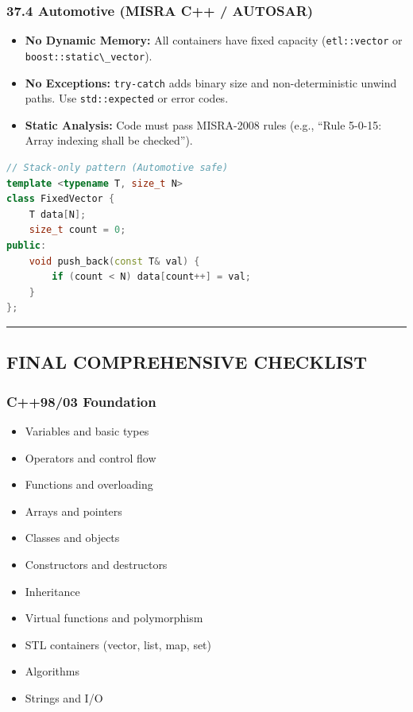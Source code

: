 \hypertarget{automotive-misra-c-autosar}{%
\subsubsection{37.4 Automotive (MISRA C++ /
AUTOSAR)}\label{automotive-misra-c-autosar}}

\begin{itemize}
\tightlist
\item
  \textbf{No Dynamic Memory:} All containers have fixed capacity
  (\passthrough{\lstinline!etl::vector!} or
  \passthrough{\lstinline!boost::static\_vector!}).
\item
  \textbf{No Exceptions:} \passthrough{\lstinline!try-catch!} adds
  binary size and non-deterministic unwind paths. Use
  \passthrough{\lstinline!std::expected!} or error codes.
\item
  \textbf{Static Analysis:} Code must pass MISRA-2008 rules (e.g.,
  ``Rule 5-0-15: Array indexing shall be checked'').
\end{itemize}

\begin{lstlisting}[language={C++}]
// Stack-only pattern (Automotive safe)
template <typename T, size_t N>
class FixedVector {
    T data[N];
    size_t count = 0;
public:
    void push_back(const T& val) {
        if (count < N) data[count++] = val;
    }
};
\end{lstlisting}

\begin{center}\rule{0.5\linewidth}{0.5pt}\end{center}

\hypertarget{final-comprehensive-checklist}{%
\subsection{FINAL COMPREHENSIVE
CHECKLIST}\label{final-comprehensive-checklist}}

\hypertarget{c9803-foundation}{%
\subsubsection{C++98/03 Foundation}\label{c9803-foundation}}

\begin{itemize}
\tightlist
\item
  Variables and basic types
\item
  Operators and control flow
\item
  Functions and overloading
\item
  Arrays and pointers
\item
  Classes and objects
\item
  Constructors and destructors
\item
  Inheritance
\item
  Virtual functions and polymorphism
\item
  STL containers (vector, list, map, set)
\item
  Algorithms
\item
  Strings and I/O
\end{itemize}

